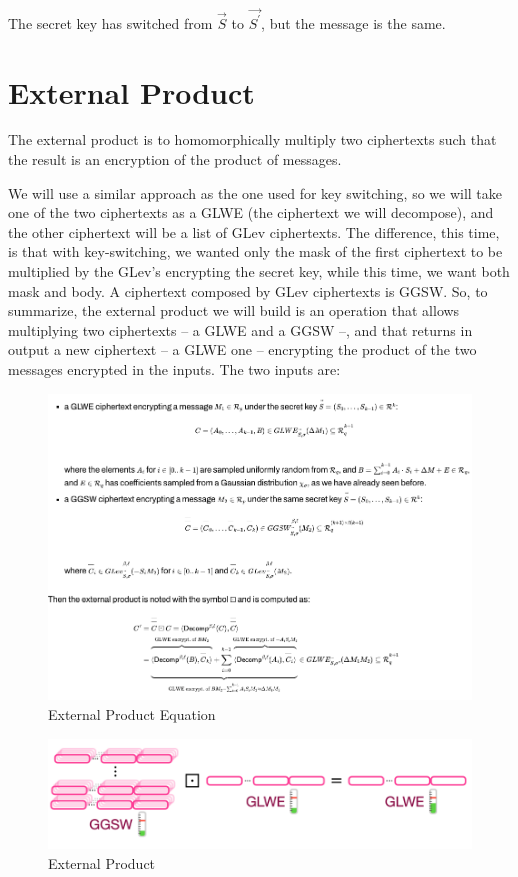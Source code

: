 \documentclass{techrep}
\theoremstyle{definition}
\theoremstyle{plain}
\begin{document}
The secret key has switched from $\overrightarrow{S}$ to $\overrightarrow{S^{'}}$, but the message is the same.

\section{External Product}
The external product is to homomorphically multiply two ciphertexts such that the result is an encryption of the product of messages.

We will use a similar approach as the one used for key switching, so we will take one of the two ciphertexts as a GLWE (the ciphertext we will decompose), and the other ciphertext will be a list of GLev ciphertexts. The difference, this time, is that with key-switching, we wanted only the mask of the first ciphertext to be multiplied by the GLev's encrypting the secret key, while this time, we want both mask and body. A ciphertext composed by GLev ciphertexts is GGSW. So, to summarize, the external product we will build is an operation that allows multiplying two ciphertexts -- a GLWE and a GGSW --, and that returns in output a new ciphertext -- a GLWE one -- encrypting the product of the two messages encrypted in the inputs. The two inputs are:


	\begin{figure}[H]
		\centering
	\includegraphics[width=1.1\columnwidth]{fig/external-product.png}
		\caption{External Product Equation}
		\label{fig:externalproduct}
	\end{figure}



	\begin{figure}[H]
		\centering
	\includegraphics[width=0.9\columnwidth]{fig/exter-prod.png}
		\caption{External Product}
		\label{fig:exterprod}
	\end{figure}
\end{document}
